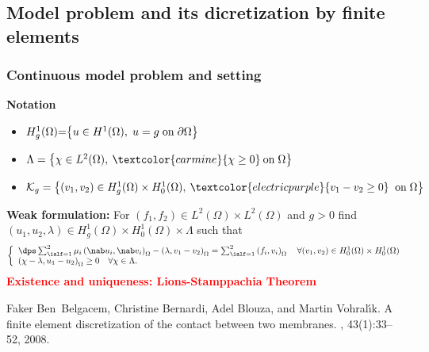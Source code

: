\documentclass[10 pt]{beamer}
\begin{document}
\begin{frame}
\section{Model problem and its dicretization by finite elements}  
\frametitle{Continuous model problem and setting}
\textbf{Notation}
\begin{itemize}
\item $H_g^1(\Omega)\hspace{-0.1 cm} =\hspace{-0.1 cm} \left\{u\in H^1(\Omega), \hspace{0.1 cm} u=g \hspace{0.1 cm} \mbox{on} \hspace{0.1 cm} \partial \Omega\right\}$
\item $\Lambda=\left\{\chi\in L^2(\Omega), \: \textcolor{carmine}{\chi \geq 0} \: \mbox{on} \hspace{0.1 cm} \Omega\right\}$
\item
$\mathcal{K}_g= \left\{(v_1,v_2)\in H_g^1(\Omega)\times H_0^1(\Omega),\: \textcolor{electricpurple}{v_1-v_2 \geq 0} \; \; \mbox{on} 
\hspace{0.1 cm} \Omega \right\}$
\end{itemize}
\textbf{Weak formulation:}
For $(f_1,f_2)\in L^2(\Omega)\times L^2 (\Omega)$ and $g > 0$ find $(u_1,u_2,\lambda)\in H_g^1(\Omega)\times H_0^1(\Omega) \times \Lambda$ such that
\begin{equation*}
\left\lbrace\begin{array}{llccc}
\dps \sum_{\ialf=1}^2 \mu_i \left(\nab u_i,\nab v_i\right)_{\Omega} - \left(\lambda,v_1-v_2\right)_{\Omega} = \sum_{\ialf=1}^2\left(f_i,v_i\right)_{\Omega} \quad \forall (v_1,v_2) \in H_0^1(\Omega)\times H_0^1(\Omega) \\
\left(\chi - \lambda,u_1-u_2\right)_{\Omega} \geq 0 
\quad \forall \chi \in \Lambda.
\end{array}
\right.
\label{eq:formulation_variationnelle_probleme_initial}
\end{equation*}
\textcolor{red}{\textbf{Existence and uniqueness: Lions-Stamppachia Theorem}}
\scriptsize
\begin{thebibliography}{10}
Faker Ben~Belgacem, Christine Bernardi, Adel Blouza, and Martin
  Vohral{\'{\i}}k.
\newblock A finite element discretization of the contact between two membranes.
, 43(1):33--52, 2008.
\end{thebibliography}
\end{frame}
\end{document}
